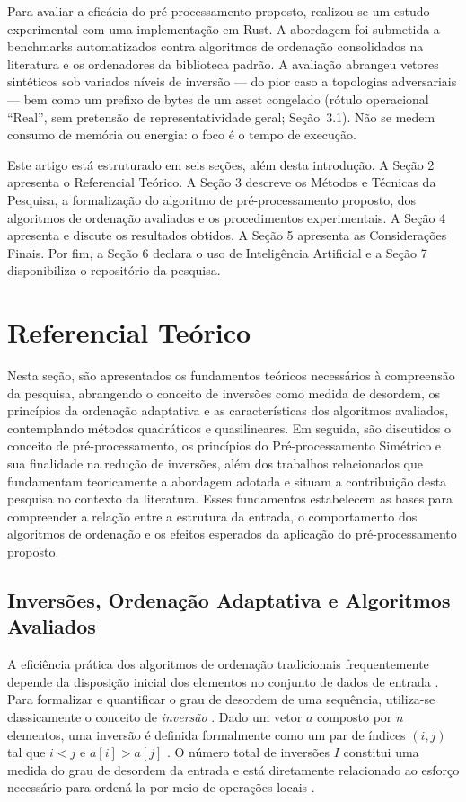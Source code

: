 \documentclass[portuguese]{sbc2025}%
\begin{document}
Para avaliar a eficácia do pré-processamento proposto, realizou-se um estudo experimental com uma implementação em Rust. A abordagem foi submetida a benchmarks automatizados contra algoritmos de ordenação consolidados na literatura e os ordenadores da biblioteca padrão. A avaliação abrangeu vetores sintéticos sob variados níveis de inversão — do pior caso a topologias adversariais — bem como um prefixo de bytes de um asset congelado (rótulo operacional ``Real'', sem pretensão de representatividade geral; Seção~3.1). Não se medem consumo de memória ou energia: o foco é o tempo de execução.

Este artigo está estruturado em seis seções, além desta introdução. A Seção 2 apresenta o Referencial Teórico. A Seção 3 descreve os Métodos e Técnicas da Pesquisa, a formalização do algoritmo de pré-processamento proposto, dos algoritmos de ordenação avaliados e os procedimentos experimentais. A Seção 4 apresenta e discute os resultados obtidos. A Seção 5 apresenta as Considerações Finais. Por fim, a Seção 6 declara o uso de Inteligência Artificial e a Seção 7 disponibiliza o repositório da pesquisa.

\section{Referencial Teórico}\label{sec:fund}

Nesta seção, são apresentados os fundamentos teóricos necessários à compreensão da pesquisa, abrangendo o conceito de inversões como medida de desordem, os princípios da ordenação adaptativa e as características dos algoritmos avaliados, contemplando métodos quadráticos e quasilineares. Em seguida, são discutidos o conceito de pré-processamento, os princípios do Pré-processamento Simétrico e sua finalidade na redução de inversões, além dos trabalhos relacionados que fundamentam teoricamente a abordagem adotada e situam a contribuição desta pesquisa no contexto da literatura. Esses fundamentos estabelecem as bases para compreender a relação entre a estrutura da entrada, o comportamento dos algoritmos de ordenação e os efeitos esperados da aplicação do pré-processamento proposto.

\subsection{Inversões, Ordenação Adaptativa e Algoritmos Avaliados}

A eficiência prática dos algoritmos de ordenação tradicionais frequentemente depende da disposição inicial dos elementos no conjunto de dados de entrada \citep{cormen_introduction_2022, estivill-castro_survey_1992}. Para formalizar e quantificar o grau de desordem de uma sequência, utiliza-se classicamente o conceito de \emph{inversão} \citep{knuth_art_1973}. Dado um vetor $a$ composto por $n$ elementos, uma inversão é definida formalmente como um par de índices $(i,j)$ tal que $i < j$ e $a[i] > a[j]$ \citep{knuth_art_1973, sedgewick_algorithms_2011}. O número total de inversões $I$ constitui uma medida do grau de desordem da entrada e está diretamente relacionado ao esforço necessário para ordená-la por meio de operações locais \citep{mannila_measures_1984}.
\end{document}

